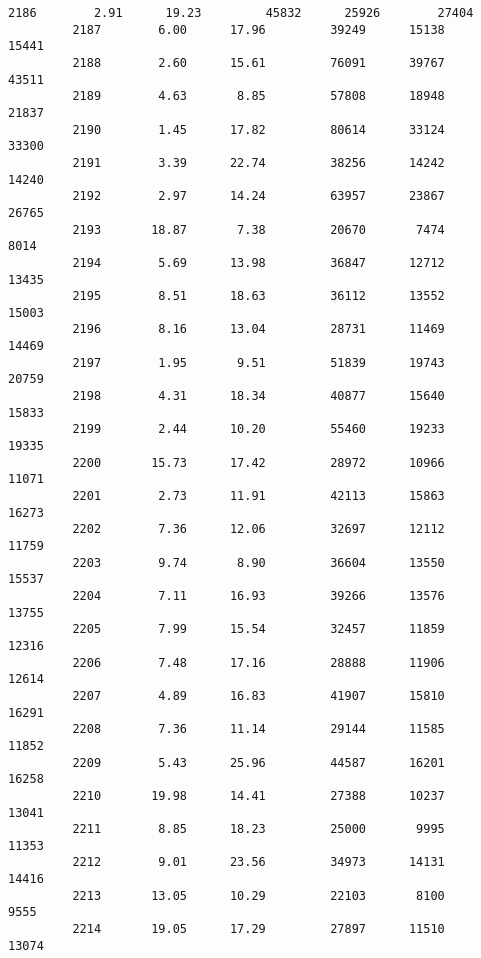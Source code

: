 \documentclass[11pt]{llncs}
\begin{document}
\begin{Verbatim}[commandchars=\\\{\}]
         2186        2.91      19.23         45832      25926        27404   
         2187        6.00      17.96         39249      15138        15441   
         2188        2.60      15.61         76091      39767        43511   
         2189        4.63       8.85         57808      18948        21837   
         2190        1.45      17.82         80614      33124        33300   
         2191        3.39      22.74         38256      14242        14240   
         2192        2.97      14.24         63957      23867        26765   
         2193       18.87       7.38         20670       7474         8014   
         2194        5.69      13.98         36847      12712        13435   
         2195        8.51      18.63         36112      13552        15003   
         2196        8.16      13.04         28731      11469        14469   
         2197        1.95       9.51         51839      19743        20759   
         2198        4.31      18.34         40877      15640        15833   
         2199        2.44      10.20         55460      19233        19335   
         2200       15.73      17.42         28972      10966        11071   
         2201        2.73      11.91         42113      15863        16273   
         2202        7.36      12.06         32697      12112        11759   
         2203        9.74       8.90         36604      13550        15537   
         2204        7.11      16.93         39266      13576        13755   
         2205        7.99      15.54         32457      11859        12316   
         2206        7.48      17.16         28888      11906        12614   
         2207        4.89      16.83         41907      15810        16291   
         2208        7.36      11.14         29144      11585        11852   
         2209        5.43      25.96         44587      16201        16258   
         2210       19.98      14.41         27388      10237        13041   
         2211        8.85      18.23         25000       9995        11353   
         2212        9.01      23.56         34973      14131        14416   
         2213       13.05      10.29         22103       8100         9555   
         2214       19.05      17.29         27897      11510        13074   
         

\end{Verbatim}
\end{document}
